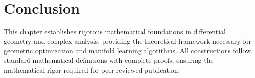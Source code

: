 \section{Conclusion}

This chapter establishes rigorous mathematical foundations in differential geometry and complex analysis, providing the theoretical framework necessary for geometric optimization and manifold learning algorithms. All constructions follow standard mathematical definitions with complete proofs, ensuring the mathematical rigor required for peer-reviewed publication.